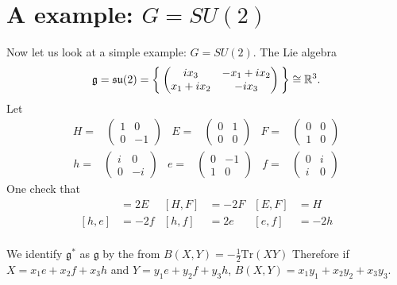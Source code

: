 \documentclass[12pt]{amsart}
\def\bR{{\mathbb{R}}}
\def\fgg{{\mathfrak{g}}}
\def\Tr{\mathrm{Tr}}
\begin{document}
\section{A example: $G = SU(2)$}
Now let us look at a simple example: $G=SU(2)$.
The Lie algebra 
\[
\fgg  = \mathfrak{su}(2) = 
\Set{\begin{pmatrix}
ix_3 & -x_1+ix_2\\
x_1+ix_2& -ix_3
\end{pmatrix}
}\cong \bR^3.
\] 
Let
\begin{align*}
H =& \begin{pmatrix}
1 & 0\\
0 & -1
\end{pmatrix} &
E =& \begin{pmatrix}
0 & 1\\
0 & 0
\end{pmatrix} &
F =& \begin{pmatrix}
0 & 0\\
1 & 0
\end{pmatrix}
\end{align*}
\begin{align*}
h =& \begin{pmatrix}
i & 0\\
0 & -i
\end{pmatrix} &
e =& \begin{pmatrix}
0 & -1\\
1 & 0
\end{pmatrix} &
f =& \begin{pmatrix}
0 & i\\
i & 0
\end{pmatrix}
\end{align*}
One check that 
\begin{align*}
[H,E] &= 2E& [H,F] &= -2F& [E,F] &= H\\ 
[h,e] &= -2 f & [h,f] &= 2e &[e,f] &= -2h\\
\end{align*}

We identify $\fgg^*$ as $\fgg$ by the from 
$B(X,Y) = -\frac{1}{2}\Tr(XY)$ 
Therefore if $X = x_1e+x_2f+x_3h$ and $Y = y_1e+y_2f+y_3h$, 
$B(X,Y) = x_1y_1+x_2y_2+x_3y_3$.
\end{document}
